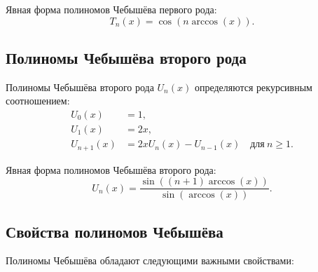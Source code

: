 \documentclass{article}
\begin{document}
Явная форма полиномов Чебышёва первого рода:
\[
T_n(x) = \cos(n \arccos(x)).
\]

\subsection*{Полиномы Чебышёва второго рода}

Полиномы Чебышёва второго рода \( U_n(x) \) определяются рекурсивным соотношением:
\begin{align*}
U_0(x) &= 1, \\
U_1(x) &= 2x, \\
U_{n+1}(x) &= 2x U_n(x) - U_{n-1}(x) \quad \text{для} \ n \geq 1.
\end{align*}

Явная форма полиномов Чебышёва второго рода:
\[
U_n(x) = \frac{\sin((n+1) \arccos(x))}{\sin(\arccos(x))}.
\]

\subsection*{Свойства полиномов Чебышёва}

Полиномы Чебышёва обладают следующими важными свойствами:
\end{document}
